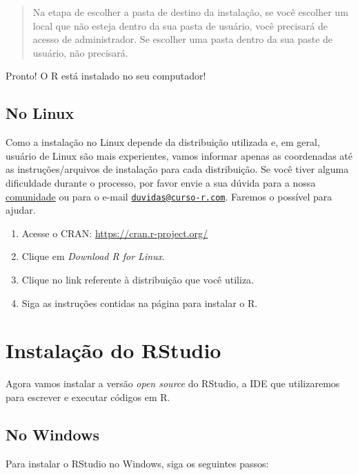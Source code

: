 \documentclass[
]{book}
\begin{document}
\begin{quote}
Na etapa de escolher a pasta de destino da instalação, se você escolher um local que não esteja dentro da sua pasta de usuário, você precisará de acesso de administrador. Se escolher uma pasta dentro da sua paste de usuário, não precisará.
\end{quote}

Pronto! O R está instalado no seu computador!

\hypertarget{no-linux}{%
\subsection{No Linux}\label{no-linux}}

Como a instalação no Linux depende da distribuição utilizada e, em geral, usuário de Linux são mais experientes, vamos informar apenas as coordenadas até as instruções/arquivos de instalação para cada distribuição. Se você tiver alguma dificuldade durante o processo, por favor envie a sua dúvida para a nossa \href{https://discourse.curso-r.com/}{comunidade} ou para o e-mail \href{mailto:duvidas@curso-r.com}{\nolinkurl{duvidas@curso-r.com}}. Faremos o possível para ajudar.

\begin{enumerate}
\def\labelenumi{\arabic{enumi}.}
\item
  Acesse o CRAN: \url{https://cran.r-project.org/}
\item
  Clique em \emph{Download R for Linux}.
\item
  Clique no link referente à distribuição que você utiliza.
\item
  Siga as instruções contidas na página para instalar o R.
\end{enumerate}

\hypertarget{instalauxe7uxe3o-do-rstudio}{%
\section{Instalação do RStudio}\label{instalauxe7uxe3o-do-rstudio}}

Agora vamos instalar a versão \emph{open source} do RStudio, a IDE que utilizaremos para escrever e executar códigos em R.

\hypertarget{no-windows-1}{%
\subsection{No Windows}\label{no-windows-1}}

Para instalar o RStudio no Windows, siga os seguintes passos:
\end{document}
